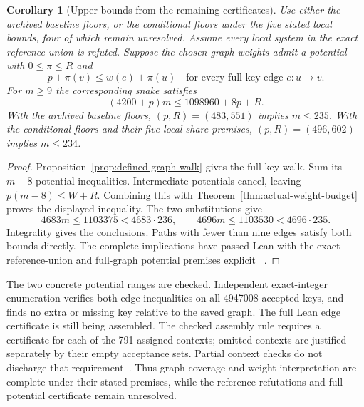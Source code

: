 \documentclass[11pt,a4paper]{article}
\newtheorem{corollary}[theorem]{Corollary}
\theoremstyle{definition}
\theoremstyle{remark}
\begin{document}
\begin{corollary}[Upper bounds from the remaining certificates]\label{cor:reference-potential-bounds}
Use either the archived baseline floors, or the conditional floors under
the five stated local bounds, four of which remain unresolved. Assume every local system in the exact reference union
is refuted. Suppose the chosen graph weights admit a potential with
$0\le\pi\le R$ and
\[
p+\pi(v)\le w(e)+\pi(u)
\quad\text{for every full-key edge }e:u\to v.
\]
For $m\ge9$ the corresponding snake satisfies
\[
(4200+p)m\le1098960+8p+R.
\]
With the archived baseline floors, $(p,R)=(483,551)$ implies $m\le235$.
With the conditional floors and their five local share premises,
$(p,R)=(496,602)$ implies $m\le234$.
\end{corollary}
\begin{proof}
Proposition~\ref{prop:defined-graph-walk} gives the full-key walk. Sum its
$m-8$ potential inequalities. Intermediate potentials cancel, leaving
$p(m-8)\le W+R$. Combining this with
Theorem~\ref{thm:actual-weight-budget} proves the displayed inequality. The
two substitutions give
\[
4683m\le1103375<4683\cdot236,
\qquad
4696m\le1103530<4696\cdot235.
\]
Integrality gives the conclusions. Paths with fewer than nine edges satisfy
both bounds directly. The complete implications have passed Lean with the
exact reference-union and full-graph potential premises explicit
~\cite{referenceunionarchive}.
\end{proof}

The two concrete potential ranges are checked. Independent exact-integer
enumeration verifies both edge inequalities on all 4947008 accepted keys,
and finds no extra or missing key relative to the saved graph. The full
Lean edge certificate is still being assembled. The checked assembly rule
requires a certificate for each of the 791 assigned contexts; omitted
contexts are justified separately by their empty acceptance sets. Partial
context checks do not discharge that requirement~\cite{potentialcertificatearchive}.
Thus graph coverage and weight interpretation are complete under their
stated premises, while the reference refutations and full potential
certificate remain unresolved.
\end{document}
